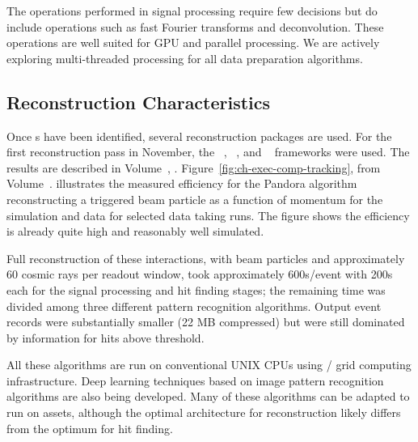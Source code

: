 The operations performed in signal processing require few decisions but do include operations such as fast Fourier transforms and deconvolution.  These operations are well suited for GPU and parallel processing. We are actively exploring multi-threaded processing for all data preparation algorithms. 


\subsection{Reconstruction Characteristics}



Once s have been identified, several \threed  reconstruction packages are used. For the first reconstruction pass in November, the  ~\cite{Acciarri:2017hat}, ~\cite{wirecell}, and ~\cite{ref:PMA}  frameworks were used. The results are described in Volume~\volnumberphysics{}, \voltitlephysics{}. 
Figure~\ref{fig:ch-exec-comp-tracking}, from Volume~\volnumberphysics{}. illustrates the measured efficiency for the Pandora algorithm reconstructing a triggered beam particle as a function of momentum for the simulation and data for selected data taking runs. The figure shows the efficiency is already quite high and reasonably well simulated.




Full reconstruction of these  interactions, with beam particles and approximately 60 cosmic rays per readout window, took  approximately 600s/event with 200s each for the signal processing and hit finding stages; the remaining time was divided among three different pattern recognition algorithms. Output event records were substantially smaller (22 MB compressed) but were still dominated by information for  hits above threshold. 

All these algorithms are run on conventional UNIX CPUs using / grid computing  infrastructure. Deep learning techniques based on image pattern recognition algorithms are also being developed. Many of these algorithms can be adapted to run on  assets, although the optimal architecture for \threed reconstruction likely differs from the optimum for hit finding.


